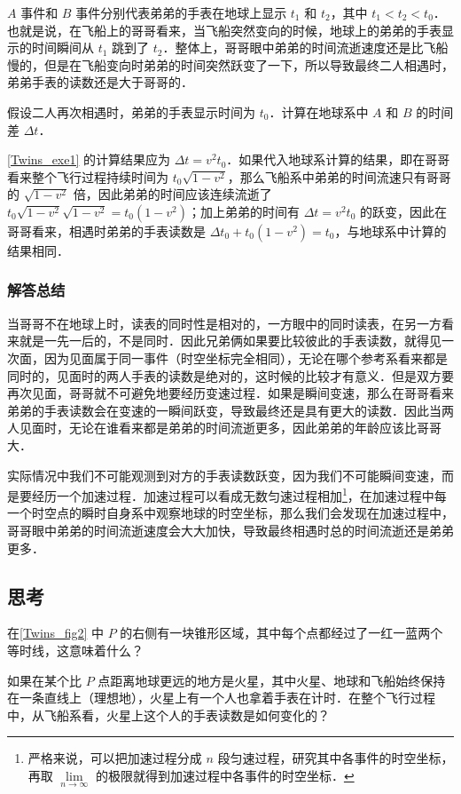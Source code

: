 $A$ 事件和 $B$ 事件分别代表弟弟的手表在地球上显示 $t_1$ 和 $t_2$，其中 $t_1<t_2<t_0$．也就是说，在飞船上的哥哥看来，当飞船突然变向的时候，地球上的弟弟的手表显示的时间瞬间从 $t_1$ 跳到了 $t_2$．整体上，哥哥眼中弟弟的时间流逝速度还是比飞船慢的，但是在飞船变向时弟弟的时间突然跃变了一下，所以导致最终二人相遇时，弟弟手表的读数还是大于哥哥的．

\begin{exercise}{}\label{Twins_exe1}
假设二人再次相遇时，弟弟的手表显示时间为 $t_0$．计算在地球系中 $A$ 和 $B$ 的时间差 $\Delta t$．
\end{exercise}

\autoref{Twins_exe1} 的计算结果应为 $\Delta t=v^2t_0$．如果代入地球系计算的结果，即在哥哥看来整个飞行过程持续时间为 $t_0\sqrt{1-v^2}$，那么飞船系中弟弟的时间流速只有哥哥的 $\sqrt{1-v^2}$ 倍，因此弟弟的时间应该连续流逝了 $t_0\sqrt{1-v^2}\sqrt{1-v^2}=t_0(1-v^2)$；加上弟弟的时间有 $\Delta t=v^2t_0$ 的跃变，因此在哥哥看来，相遇时弟弟的手表读数是 $\Delta t_0+t_0(1-v^2)=t_0$，与地球系中计算的结果相同．

\subsubsection{解答总结}

当哥哥不在地球上时，读表的同时性是相对的，一方眼中的同时读表，在另一方看来就是一先一后的，不是同时．因此兄弟俩如果要比较彼此的手表读数，就得见一次面，因为见面属于同一事件（时空坐标完全相同），无论在哪个参考系看来都是同时的，见面时的两人手表的读数是绝对的，这时候的比较才有意义．但是双方要再次见面，哥哥就不可避免地要经历变速过程．如果是瞬间变速，那么在哥哥看来弟弟的手表读数会在变速的一瞬间跃变，导致最终还是具有更大的读数．因此当两人见面时，无论在谁看来都是弟弟的时间流逝更多，因此弟弟的年龄应该比哥哥大．

实际情况中我们不可能观测到对方的手表读数跃变，因为我们不可能瞬间变速，而是要经历一个加速过程．加速过程可以看成无数匀速过程相加\footnote{严格来说，可以把加速过程分成 $n$ 段匀速过程，研究其中各事件的时空坐标，再取 $\lim\limits_{n\rightarrow\infty}$ 的极限就得到加速过程中各事件的时空坐标．}，在加速过程中每一个时空点的瞬时自身系中观察地球的时空坐标，那么我们会发现在加速过程中，哥哥眼中弟弟的时间流逝速度会大大加快，导致最终相遇时总的时间流逝还是弟弟更多．

\subsection{思考}

在\autoref{Twins_fig2} 中 $P$ 的右侧有一块锥形区域，其中每个点都经过了一红一蓝两个等时线，这意味着什么？

如果在某个比 $P$ 点距离地球更远的地方是火星，其中火星、地球和飞船始终保持在一条直线上（理想地），火星上有一个人也拿着手表在计时．在整个飞行过程中，从飞船系看，火星上这个人的手表读数是如何变化的？







